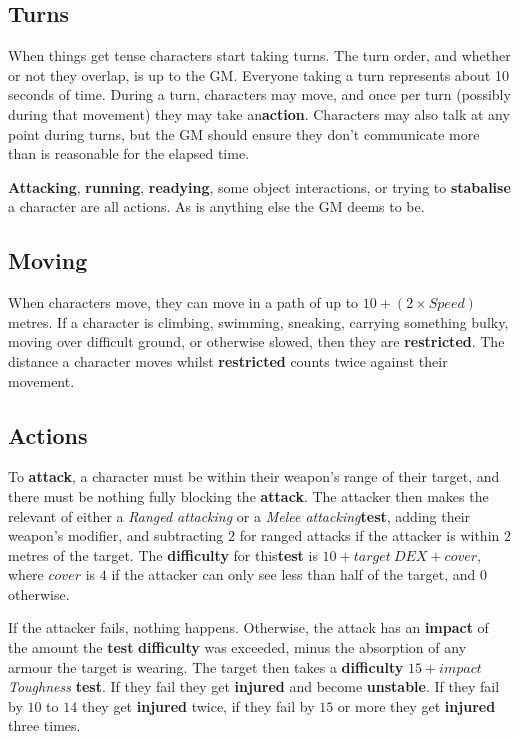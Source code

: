 \documentclass[11pt]{article}
\begin{document}
\begin{multicols}{3}
  \subsection*{Turns}

  When things get tense characters start taking turns. The turn order, and whether or not they overlap, is up to the GM. Everyone taking a turn represents about 10 seconds of time. During a turn, characters may move, and once per turn (possibly during that movement) they may take an ​\textbf{action​}. Characters may also talk at any point during turns, but the GM should ensure they don’t communicate more than is reasonable for the elapsed time.
  
  \textbf{Attacking}, \textbf{running}, \textbf{readying}, some object interactions, or trying to \textbf{stabalise} a character are all actions. As is anything else the GM deems to be.
  

  \subsection*{Moving}

  When characters move, they can move in a path of up to $10 + (2 \times Speed)$ metres. If a character is climbing, swimming, sneaking, carrying something bulky, moving over difficult ground, or otherwise slowed, then they are \textbf{restricted}. The distance a character moves whilst \textbf{restricted} counts twice against their movement.

  \subsection*{Actions}

  To \textbf{attack}, a character must be within their weapon's range of their target, and there must be nothing fully blocking the \textbf{attack}. The attacker then makes the relevant of either a \textit{​Ranged attacking​} or a \textit{​Melee attacking​​}  \textbf{test​}, adding their weapon's modifier, and subtracting $2$ for ranged attacks if the attacker is within $2$ metres of the target. The \textbf{difficulty} for this ​\textbf{test​} is $10 + target\:DEX + cover$, where $cover$ is $4$ if the attacker can only see less than half of the target, and $0$ otherwise.

  If the attacker fails, nothing happens. Otherwise, the attack has an \textbf{impact} of the amount the \textbf{test} \textbf{difficulty} was exceeded, minus the absorption of any armour the target is wearing. The target then takes a \textbf{difficulty} $15 + impact$ \textit{Toughness} \textbf{test}. If they fail they get \textbf{injured} and become \textbf{unstable}. If they fail by $10$ to $14$ they get \textbf{injured} twice, if they fail by $15$ or more they get \textbf{injured} three times.


\end{multicols}
\end{document}
